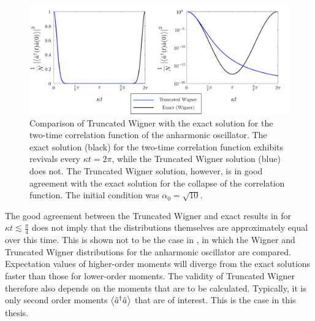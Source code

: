 \begin{figure}
    \centering
    \includegraphics[width=15cm]{TwoTimeTWComparison}
    \caption{
        Comparison of Truncated Wigner with the exact solution for the two-time correlation function of the anharmonic oscillator.  The exact solution (black) for the two-time correlation function exhibits revivals every $\kappa t = 2\pi$, while the Truncated Wigner solution (blue) does not.  The Truncated Wigner solution, however, is in good agreement with the exact solution for the collapse of the correlation function.  The initial condition was $\alpha_0 = \sqrt{10}$. \label{BackgroundTheory:TwoTimeTWComparison}
    }
\end{figure}

The good agreement between the Truncated Wigner and exact results in  for $\kappa t \lesssim \frac{\pi}{4}$ does not imply that the distributions themselves are approximately equal over this time.  This is shown not to be the case in , in which the Wigner and Truncated Wigner distributions for the anharmonic oscillator are compared.  Expectation values of higher-order moments will diverge from the exact solutions faster than those for lower-order moments.  The validity of Truncated Wigner therefore also depends on the moments that are to be calculated.  Typically, it is only second order moments ${\big<\hat{a}^\dagger \hat{a}\big>}$ that are of interest. This is the case in this thesis.

